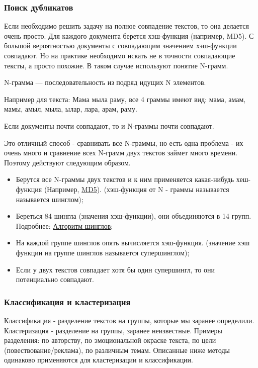 \subsubsection {Поиск дубликатов}
Если необходимо решить задачу на полное совпадение текстов, то она делается очень просто. Для каждого документа берется хэш-функция (например, MD5). С большой вероятностью документы с совпадающим значением хэш-функции совпадают. Но на практике необходимо искать не в точности совпадающие тексты, а просто похожие. В таком случае используют понятие N-грамм.  \\
\begin{defn} N-грамма — последовательность из подряд идущих N элементов. \end{defn}
Например для текста: Мама мыла раму, все 4 граммы имеют вид: мама, амам, мамы, амыл, мыла, ылар, лара, арам, раму.  \\
\begin{theorem}
Если документы почти совпадают, то и N-граммы почти совпадают.
\end{theorem}
Это отличный способ - сравнивать все N-граммы, но есть одна проблема - их очень много и сравнение всех N-грамм двух текстов займет много времени. Поэтому действуют следующим образом.

\begin {itemize}
\item Берутся все N-граммы двух текстов и к ним применяется какая-нибудь хеш-функция (Например, \href{https://clck.ru/9cRa4}{MD5}). (хэш-функция от N - граммы называется называется шинглом);
\item Береться 84 шингла (значения хэш-функции), они объединяются в 14 групп. Подробнее: \href{https://habr.com/ru/post/65944/}{Алгоритм шинглов};
\item На каждой группе шинглов опять вычисляется хэш-функция. (значение хэш функции на группе шинглов называется супершинглом);
\item Если у двух текстов совпадает хотя бы один супершингл,  то они потенциально совпадают.
\end {itemize}

\subsubsection {Классификация и кластеризация}
Классификация - разделение текстов на группы, которые мы заранее определили. Кластеризация - разделение на группы, заранее неизвестные.
Примеры разделения: по авторству, по эмоциональной окраске текста, по цели (повествование/реклама), по различным темам.
Описанные ниже методы одинаково применяются для кластеризации и классификации.

